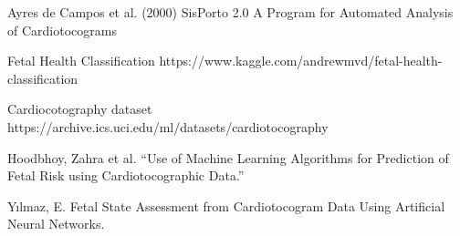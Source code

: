 \documentclass[a4paper,12pt]{article}
\begin{document}
\begin{thebibliography}{9}
Ayres de Campos et al. (2000) SisPorto 2.0 A Program for Automated Analysis of Cardiotocograms

Fetal Health Classification https://www.kaggle.com/andrewmvd/fetal-health-classification

Cardiocotography dataset https://archive.ics.uci.edu/ml/datasets/cardiotocography

Hoodbhoy, Zahra et al. “Use of Machine Learning Algorithms for Prediction of Fetal Risk using Cardiotocographic Data.”

Yılmaz, E. Fetal State Assessment from Cardiotocogram Data Using Artificial Neural Networks.

\end{thebibliography}
\end{document}
